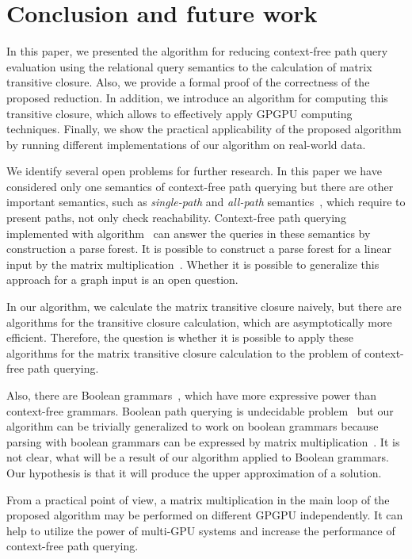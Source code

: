 \section{Conclusion and future work}
In this paper, we presented the algorithm for reducing context-free path query evaluation using the relational query semantics to the calculation of matrix transitive closure. Also, we provide a formal proof of the correctness of the proposed reduction. In addition, we introduce an algorithm for computing this transitive closure, which allows to effectively apply GPGPU computing techniques. Finally, we show the practical applicability of the proposed algorithm by running different implementations of our algorithm on real-world data.

We identify several open problems for further research. In this paper we have considered only one semantics of context-free path querying but there are other important semantics, such as \textit{single-path} and \textit{all-path} semantics~\cite{hellingsPathQuerying}, which require to present paths, not only check reachability. Context-free path querying implemented with algorithm~\cite{GLL} can answer the queries in these semantics by construction a parse forest. It is possible to construct a parse forest for a linear input by the matrix multiplication~\cite{okhotin_cyk}. Whether it is possible to generalize this approach for a graph input is an open question.

In our algorithm, we calculate the matrix transitive closure naively, but there are algorithms for the transitive closure calculation, which are asymptotically more efficient. Therefore, the question is whether it is possible to apply these algorithms for the matrix transitive closure calculation to the problem of context-free path querying.

Also, there are Boolean grammars~\cite{okhotinBoolean}, which have more expressive power than context-free grammars. Boolean path querying is undecidable problem~\cite{hellingsRelational} but our algorithm can be trivially generalized to work on boolean grammars because parsing with boolean grammars can be expressed by matrix multiplication~\cite{okhotin_cyk}. It is not clear, what will be a result of our algorithm applied to Boolean grammars. Our hypothesis is that it will produce the upper approximation of a solution.

From a practical point of view, a matrix multiplication in the main loop of the proposed algorithm may be performed on different GPGPU independently. It can help to utilize the power of multi-GPU systems and increase the performance of context-free path querying.